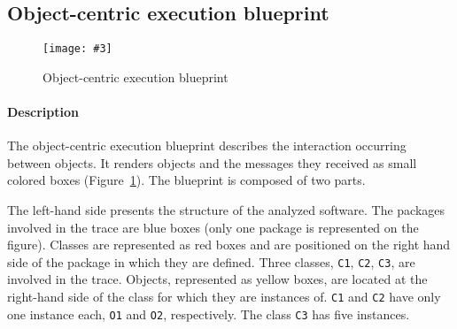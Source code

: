 \documentclass{sig-alternate}
\newcommand{\ct}{\lstinline[backgroundcolor=\color{white},basicstyle=\footnotesize\ttfamily]}
\newcommand{\fig}[4]{
	\begin{figure}[#1]
		\centering
		\texttt{[image: \#3]}
		\caption{\label{fig:#3}#4}
	\end{figure}}
\newcommand{\figref}[1]{Figure~\ref{fig:#1}}
\begin{document}


%

\subsection{Object-centric execution blueprint}

\fig{}{0.4}{ObjectCentricBlueprint}{Object-centric execution blueprint}

\paragraph{Description}
The object-centric execution blueprint describes the interaction occurring between objects. It renders objects and the messages they received as small colored boxes (\figref{ObjectCentricBlueprint}). The blueprint is composed of two parts.

The left-hand side presents the structure of the analyzed software. The packages involved in the trace are blue boxes (only one package is represented on the figure). 
Classes are represented as red boxes and are positioned on the right hand side of the package in which they are defined. Three classes, \ct{C1}, \ct{C2}, \ct{C3}, are involved in the trace. Objects, represented as yellow boxes, are located at the right-hand side of the class for which they are instances of. \ct{C1} and \ct{C2} have only one instance each, \ct{O1} and \ct{O2}, respectively. The class \ct{C3} has five instances.
\end{document}
